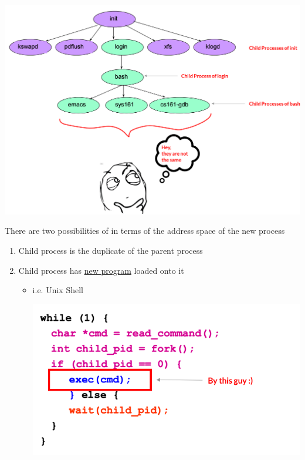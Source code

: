 \documentclass[12pt]{article}
\begin{document}
\begin{itemize}
\begin{itemize}
        \begin{center}
        \includegraphics[width=\linewidth]{images/week_1_notes_1_10.png}
        \end{center}

        \bigskip

        There are two possibilities of in terms of the address space of the new
        process

        \bigskip

        \begin{enumerate}[1.]
            \item Child process is the duplicate of the parent process
            \item Child process has \underline{new program} loaded onto it
            \begin{itemize}
                \item i.e. Unix Shell

                \begin{center}
                \includegraphics[width=0.8\linewidth]{images/week_1_notes_1_11.png}
                \end{center}


\end{itemize}
\end{enumerate}
\end{itemize}
\end{itemize}
\end{document}
